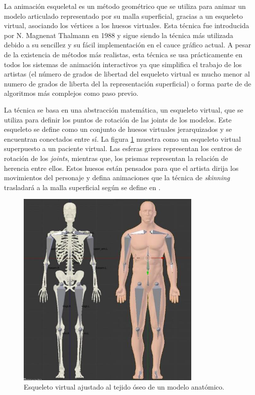 La animación esqueletal es un método geométrico que se utiliza para animar un modelo articulado representado por su malla superficial, gracias a un esqueleto virtual, asociando los vértices a los huesos virtuales. %
Esta técnica fue introducida por N. Magnenat Thalmann en 1988 \cite{thalmann88} y sigue siendo la técnica más utilizada debido a su sencillez y su fácil implementación en el cauce gráfico actual. A pesar de la existencia de métodos más realistas, esta técnica se usa prácticamente en todos los sistemas de animación interactivos ya que simplifica el trabajo de los artistas (el número de grados de libertad del esqueleto virtual es mucho menor al numero de grados de liberta del la representación superficial) o forma parte de de algoritmos más complejos como paso previo. %

La técnica se basa en una abstracción matemática, un esqueleto virtual, que se utiliza para definir los puntos de rotación de las \ac{joints} de los modelos. Este esqueleto se define como un conjunto de huesos virtuales jerarquizados y se encuentran conectados entre sí. La figura \ref{fig:virtualskeleton} muestra como un esqueleto virtual superpuesto a un paciente virtual. Las esferas grises representan los centros de rotación de los \emph{\acs{joints}}, mientras que, los prismas representan la relación de herencia entre ellos. Estos huesos están pensados para que el artista dirija los movimientos del personaje y defina animaciones que la técnica de \emph{skinning} trasladará a la malla superficial según se define en \cite{thalmann88}. 

\begin{figure}[ht]
   \centering
    \includegraphics[width=0.8\textwidth]{IMG/virtualskeleton.png}
    \caption{Esqueleto virtual ajustado al tejido óseo de un modelo anatómico.}
   \label{fig:virtualskeleton}
\end{figure}

